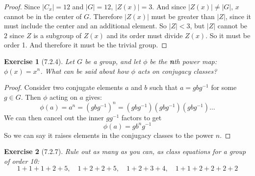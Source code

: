 \documentclass[12pt]{article}
\newtheorem*{exer}{Exercise}
\begin{document}
\begin{proof}
    Since $|C_x| = 12$ and $|G| = 12$, $|Z(x)| = 3$. And since $|Z(x)|
    \neq |G|$, $x$ cannot be in the center of $G$. Therefore $|Z(x)|$
    must be greater than $|Z|$, since it must include the center and an
    additional element. So $|Z| < 3$, but $|Z|$ cannot be $2$ since $Z$
    is a subgroup of $Z(x)$ and its order must divide $Z(x)$. So it must
    be order 1. And therefore it must be the trivial group.

\end{proof}


\begin{exer}[7.2.4]
    Let $G$ be a group, and let $\phi$ be the \textbf{n}th power
    map:$\phi(x) = x^n$. What can be said about how $\phi$ acts on
    conjugacy classes?
\end{exer}

\begin{proof}
    Consider two conjugate elements $a$ and $b$ such that $a = gbg^{-1}$
    for some $g \in G$. Then $\phi$ acting on $a$ gives:
    \[
        \phi(a)= a^n = (gbg^{-1})^n =
        (gbg^{-1})(gbg^{-1})(gbg^{-1}) \dots 
    \]
    We can then cancel out the inner $gg^{-1}$ factors to get
    \[
        \phi(a) = g b^n g^{-1}
    \]
    So we can say it raises elements in the conjugacy classes to the
    power $n$.

\end{proof}


\begin{exer}[7.2.7]
    Rule out as many as you can, as class equations for a group of order
    10:
    \[
        1 + 1 + 1 + 2 + 5, \quad 1 + 2 + 2 + 5, \quad 1 + 2 + 3 + 4,
        \quad 1 + 1 + 2 + 2 + 2 + 2
    \]
\end{exer}
\end{document}
